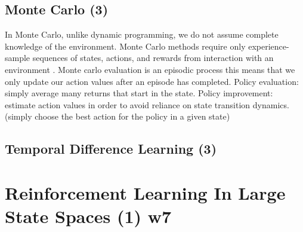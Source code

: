 \subsection{Monte Carlo (3)}\label{subsec:mc}
In Monte Carlo, unlike dynamic programming, we do not assume complete knowledge of the environment.
Monte Carlo methods require only experience-sample sequences of states, actions, and rewards from interaction with
an environment \cite{sutton1998reinforcement}.
Monte carlo evaluation is an episodic process this means that we only update our action values after an episode
has completed.
Policy evaluation: simply average many returns that start in the state.
Policy improvement: estimate action values in order to avoid reliance on state transition dynamics.
(simply choose the best action for the policy in a given state)


\subsection{Temporal Difference Learning (3)}\label{subsec:td}


\section{Reinforcement Learning In Large State Spaces (1) w7}\label{sec:rlLargeStateSpace}